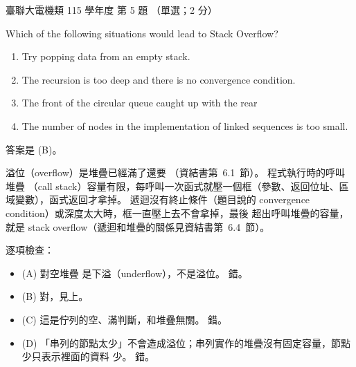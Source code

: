 \begin{pastexam}[label={px:ust-115-ee-ds-05}]{臺聯大電機類 115 學年度 第 5 題}
（單選；2 分）

Which of the following situations would lead to Stack Overflow?
\begin{enumerate}[label=(\Alph*)]
\item Try popping data from an empty stack.
\item The recursion is too deep and there is no convergence condition.
\item The front of the circular queue caught up with the rear
\item The number of nodes in the implementation of linked sequences is too small.
\end{enumerate}
\end{pastexam}

\begin{pastsoln}
答案是 (B)。

溢位（overflow）是堆疊已經滿了還要 （資結書第~6.1~節）。 程式執行時的呼叫堆疊
（call stack）容量有限，每呼叫一次函式就壓一個框（參數、返回位址、區域變數），函式返回才拿掉。
遞迴沒有終止條件（題目說的 convergence condition）或深度太大時，框一直壓上去不會拿掉，最後
超出呼叫堆疊的容量，就是 stack overflow（遞迴和堆疊的關係見資結書第~6.4~節）。

逐項檢查：
\begin{itemize}
\item (A) 對空堆疊  是下溢（underflow），不是溢位。 錯。
\item (B) 對，見上。
\item (C) 這是佇列的空、滿判斷，和堆疊無關。 錯。
\item (D) 「串列的節點太少」不會造成溢位；串列實作的堆疊沒有固定容量，節點少只表示裡面的資料
少。 錯。
\end{itemize}
\end{pastsoln}
